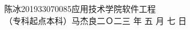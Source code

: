 \documentclass[a4paper]{nuist}
\begin{document}
{陈冰}{201933070085}{应用技术学院}{软件工程 \\ （专科起点本科）}{马杰良}{二Ｏ二三\hspace{0.4em} 年\hspace{0.4em} 五\hspace{0.4em} 月\hspace{0.4em} 七\hspace{0.4em} 日}







% 
% 
% 
% 
% 





\end{document}
